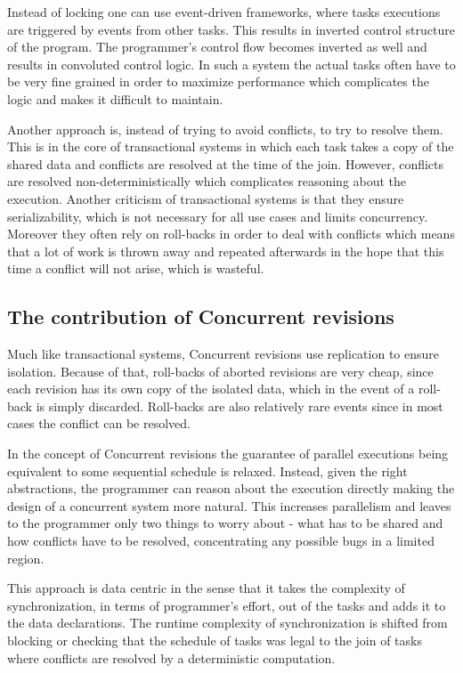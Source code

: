 \documentclass[12pt,twoside,notitlepage]{report}
\begin{document}
Instead of locking one can use event-driven frameworks, where tasks executions are triggered by events from other tasks.  This results in inverted control structure of the program. The programmer's control flow becomes inverted as well and results in convoluted control logic. In such a system the actual tasks often have to be very fine grained in order to maximize performance which complicates the logic and makes it difficult to maintain.

Another approach is, instead of trying to avoid conflicts, to try to resolve them. This is in the core of transactional systems in which each task takes a copy of the shared data and conflicts are resolved at the time of the join. However, conflicts are resolved non-deterministically which complicates reasoning about the execution. Another criticism of transactional systems is that they ensure serializability, which is not necessary for all use cases and limits concurrency\cite{database}. Moreover they often rely on roll-backs in order to deal with conflicts which means that a lot of work is thrown away and repeated afterwards in the hope that this time a conflict will not arise, which is wasteful.   



\subsection{The contribution of Concurrent revisions}

Much like transactional systems, Concurrent revisions use replication to ensure isolation. Because of that, roll-backs of aborted revisions are very cheap, since each revision has its own copy of the isolated data, which in the event of a roll-back is simply discarded. Roll-backs are also relatively rare events since in most cases the conflict can be resolved. 

In the concept of Concurrent revisions the guarantee of parallel executions being equivalent to some sequential schedule is relaxed. Instead, given the right abstractions, the programmer can reason about the execution directly making the design of a concurrent system more natural. This increases parallelism and leaves to the programmer only two things to worry about - what has to be shared and how conflicts have to be resolved, concentrating any possible bugs in a limited region.

This approach is data centric in the sense that it takes the complexity of synchronization, in terms of programmer's effort, out of the tasks and adds it to the data declarations. The runtime complexity of synchronization is shifted from blocking or checking that the schedule of tasks was legal to the join of tasks where conflicts are resolved by a deterministic computation.   
\end{document}

